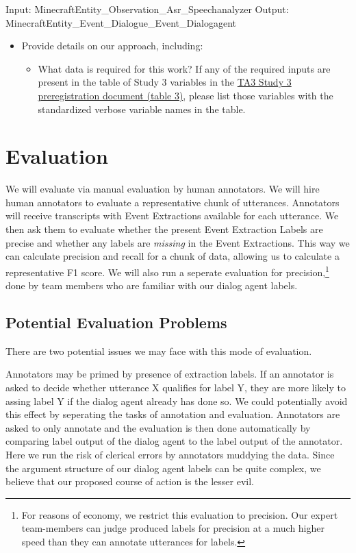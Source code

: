 Input: MinecraftEntity_Observation_Asr_Speechanalyzer
Output: MinecraftEntity_Event_Dialogue_Event_Dialogagent
\begin{itemize}
    \item Provide details on our approach, including:
        \begin{itemize}
            \item What data is required for this work? If any of the required
                inputs are present in the table of Study 3 variables in the
                \href{https://docs.google.com/document/d/1GF7VsNF9R95IAaj6mVZUDV2mAX5ok1Bh6Tcm8zDpIkg/edit#heading=h.1ksv4uv}{TA3
                Study 3 preregistration document (table 3)}, please list those
                variables with the standardized verbose variable names in the table.
        \end{itemize}
\end{itemize}

\section{Evaluation}
We will evaluate via manual evaluation by human annotators. We will hire human annotators to evaluate a representative chunk of utterances. Annotators will receive transcripts with Event Extractions available for each utterance. We then ask them to evaluate whether the present Event Extraction Labels are precise and whether any labels are \emph{missing} in the Event Extractions. This way we can calculate precision and recall for a chunk of data, allowing us to calculate a representative F1 score.
We will also run a seperate evaluation for precision,\footnote{For reasons of economy, we restrict this evaluation to precision. Our expert team-members can judge produced labels for precision at a much higher speed than they can annotate utterances for labels.} done by team members who are familiar with our dialog agent labels.
\subsection{Potential Evaluation Problems}
There are two potential issues we may face with this mode of evaluation. 

Annotators may be primed by presence of extraction labels. If an annotator is asked to decide whether utterance X qualifies for label Y, they are more likely to assing label Y if the dialog agent already has done so. We could potentially avoid this effect by seperating the tasks of annotation and evaluation. Annotators are asked to only annotate and the evaluation is then done automatically by comparing label output of the dialog agent to the label output of the annotator. Here we run the risk of clerical errors by annotators muddying the data. Since the argument structure of our dialog agent labels can be quite complex, we believe that our proposed course of action is the lesser evil.

